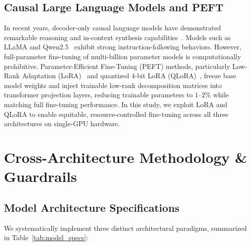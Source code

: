 \documentclass[conference]{IEEEtran}
\begin{document}
\subsection{Causal Large Language Models and PEFT}
In recent years, decoder-only causal language models have demonstrated remarkable reasoning and in-context synthesis capabilities~\cite{brown2020language}. Models such as LLaMA and Qwen2.5~\cite{qwen2024} exhibit strong instruction-following behaviors. However, full-parameter fine-tuning of multi-billion parameter models is computationally prohibitive. Parameter-Efficient Fine-Tuning (PEFT) methods, particularly Low-Rank Adaptation (LoRA)~\cite{hu2021lora} and quantized 4-bit LoRA (QLoRA)~\cite{dettmers2023qlora}, freeze base model weights and inject trainable low-rank decomposition matrices into transformer projection layers, reducing trainable parameters to $1\text{--}2\%$ while matching full fine-tuning performance. In this study, we exploit LoRA and QLoRA to enable equitable, resource-controlled fine-tuning across all three architectures on single-GPU hardware.

\section{Cross-Architecture Methodology \& Guardrails}
\label{sec:methodology}

\subsection{Model Architecture Specifications}
We systematically implement three distinct architectural paradigms, summarized in Table~\ref{tab:model_specs}:

\begin{table}[t]
\caption{Architectural Specifications of Fine-Tuned Models}
\label{tab:model_specs}
\centering
{}
\end{table}
\end{document}

